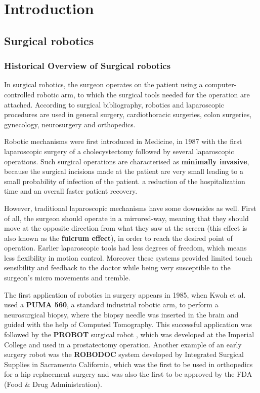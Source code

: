 \chapter{Introduction}

\section{Surgical robotics}

\subsection{Historical Overview of Surgical robotics}

In surgical robotics, the surgeon operates on the patient using a computer-controlled robotic arm, to which the surgical tools needed for the operation are attached. According to surgical bibliography, robotics and laparoscopic procedures are used in general surgery, cardiothoracic surgeries, colon surgeries, gynecology, neurosurgery and orthopedics. 

Robotic mechanisms were first introduced in Medicine, in 1987 with the first laparoscopic surgery of a cholecystectomy followed by several laparoscopic operations. Such surgical operations are characterised as \textbf{minimally invasive}, because the surgical incisions made at the patient are very small leading to a small probability of infection of the patient. a reduction of the hospitalization time and an overall faster patient recovery. 

However, traditional laparoscopic mechanisms have some downsides as well. First of all, the surgeon should operate in a mirrored-way, meaning that they should move at the opposite direction from what they saw at the screen (this effect is also known as the \textbf{fulcrum effect}), in order to reach the desired point of operation. Earlier laparoscopic tools had less degrees of freedom, which means less flexibility in motion control. Moreover these systems provided limited touch sensibility and feedback to the doctor while being very susceptible to the surgeon's micro movements and tremble. 

The first application of robotics in surgery appears in 1985, when Kwoh et al. \cite{Shao1985ANC} used a \textbf{PUMA 560}, a standard industrial robotic arm, to perform a neurosurgical biopsy, where the biopsy needle was inserted in the brain and guided with the help of Computed Tomography. This successful application was followed by the \textbf{PROBOT} surgical robot \cite{Probot1992}, which was developed at the Imperial College and used in a prostatectomy operation. Another example of an early surgery robot was the \textbf{ROBODOC} system \cite{Robodoc} developed by Integrated Surgical Supplies in Sacramento California, which was the first to be used in orthopedics for a hip replacement surgery and was also the first to be approved by the FDA (Food \& Drug Administration).

